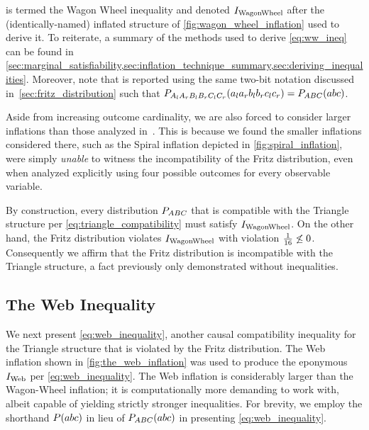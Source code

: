 \documentclass[aps, 10pt, english, twoside, pra, nofootinbib, tightenlines, longbibliography, superscriptaddress]{revtex4-1}
\begin{document}
     is termed the Wagon Wheel inequality and denoted $I_\text{WagonWheel}$ after the (identically-named) inflated structure of \cref{fig:wagon_wheel_inflation} used to derive it. To reiterate, a summary of the methods used to derive \cref{eq:ww_ineq} can be found in \cref{sec:marginal_satisfiability,sec:inflation_technique_summary,sec:deriving_inequalities}. Moreover, note that  is reported using the same two-bit notation discussed in~\cref{sec:fritz_distribution} such that $\prob[A_{l}A_{r}B_{l}B_{r}C_{l}C_{r}][a_{l}a_{r}b_{l}b_{r}c_{l}c_{r}] = \prob[ABC][abc]$.

    Aside from increasing outcome cardinality, we are also forced to consider larger inflations than those analyzed in~\cite{Inflation}. This is because we found the smaller inflations considered there, such as the Spiral inflation depicted in \cref{fig:spiral_inflation}, were simply \textit{unable} to witness the incompatibility of the Fritz distribution, even when analyzed explicitly using four possible outcomes for every observable variable.

    By construction, every distribution $\prob[ABC]$ that is compatible with the Triangle structure per \cref{eq:triangle_compatibility} must satisfy $I_\text{WagonWheel}$. On the other hand, the Fritz distribution violates $I_\text{WagonWheel}$ with violation $\frac{1}{16} \not \leq 0$. Consequently we affirm that the Fritz distribution is incompatible with the Triangle structure, a fact previously only demonstrated without inequalities.

    \subsection{The Web Inequality}
    \label{sec:noise}
    \label{sec:violations_noise}
    We next present \cref{eq:web_inequality}, another causal compatibility inequality for the Triangle structure that is violated by the Fritz distribution. The Web inflation shown in \cref{fig:the_web_inflation} was used to produce the eponymous $I_\text{Web}$ per \cref{eq:web_inequality}.  The Web inflation is considerably larger than the Wagon-Wheel inflation; it is computationally more demanding to work with, albeit capable of yielding strictly stronger inequalities. For brevity, we employ the shorthand $\prob\br{abc}$ in lieu of $\prob[ABC]\br{abc}$ in presenting \cref{eq:web_inequality}.
\end{document}
